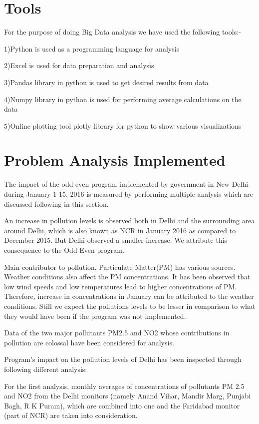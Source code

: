 \documentclass{report}
\begin{document}
\section{Tools}
For the purpose of doing Big Data analysis we have used the following tools:-

1)Python is used as a programming language for analysis

2)Excel is used for data preparation and analysis

3)Pandas library in python is used to get desired results from data

4)Numpy library in python is used for performing average calculations on the data

5)Online plotting tool plotly library for python to show various visualizations


\section{Problem Analysis Implemented}
The impact of the odd-even program implemented by government in New Delhi during January 1-15, 2016 is measured by performing multiple analysis which are discussed following in this section. 

An increase in pollution levels is observed both in Delhi and the surrounding area around Delhi, which is also known as NCR in January 2016 as compared to December 2015. But Delhi observed a smaller increase. We attribute this consequence to the Odd-Even program.

Main contributor to pollution, Particulate Matter(PM) has various sources. Weather conditions also affect the PM concentrations. It has been observed that low wind speeds and low temperatures lead to higher concentrations of PM. Therefore, increase in concentrations in January can be attributed to the weather conditions. Still we expect the pollutions levels to be lesser in comparison to what they would have been if the program was not implemented.

Data of the two major pollutants PM2.5 and NO2 whose contributions in pollution are colossal have been considered for analysis.

Program's impact on the pollution levels of Delhi has been inspected through following different analysis:

For the first analysis, monthly averages of concentrations of pollutants PM 2.5 and NO2 from the Delhi monitors (namely Anand Vihar, Mandir Marg, Punjabi Bagh, R K Puram), which are combined into one and the Faridabad monitor (part of NCR) are taken into consideration.
\end{document}
